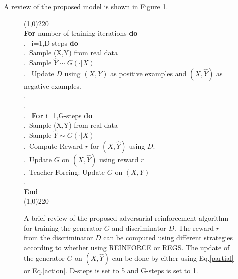 A review of the proposed model is shown in Figure \ref{fig:adver-reinforce}. 
\begin{figure}
\small
\line(1,0){220} \\
{\bf For} number of training iterations {\bf do} \\
.~\hspace{0.3cm}{\bf For} i=1,D-steps {\bf do} \\
.~\hspace{0.8cm}Sample (X,Y) from real data \\
.~\hspace{0.8cm}Sample $\hat{Y}\sim G(\cdot|X)$\\
.~\hspace{0.8cm} Update $D$ using $(X,Y)$ as positive examples and $(X,\hat{Y})$ as negative examples. \\
.~\hspace{0.3cm}{\bf End} \\
.\\
.~\hspace{0.2cm} {\bf For} i=1,G-steps {\bf do} \\
.~\hspace{0.8cm}Sample (X,Y) from real data \\
.~\hspace{0.8cm}Sample $\hat{Y}\sim G(\cdot|X)$ \\
.~\hspace{0.8cm}Compute Reward $r$ for $(X,\hat{Y})$ using $D$.\\
.~\hspace{0.8cm}Update $G$  on $(X,\hat{Y})$ using reward $r$\\
.~\hspace{0.8cm}Teacher-Forcing: Update $G$  on $(X,Y)$\\
.~\hspace{0.3cm}{\bf End} \\
{\bf End} \\
\line(1,0){220}
\caption{A brief review of the proposed adversarial reinforcement algorithm
for training the generator $G$ and discriminator $D$.
The reward $r$ from the discriminator $D$ can be computed using different strategies according to whether using REINFORCE or REGS.  
The update of the generator $G$ on $(X,\hat{Y})$ can be done by either using Eq.\ref{partial} or Eq.\ref{action}.
D-steps is set to 5 and G-steps is set to 1.}
\label{fig:adver-reinforce}
\end{figure}

